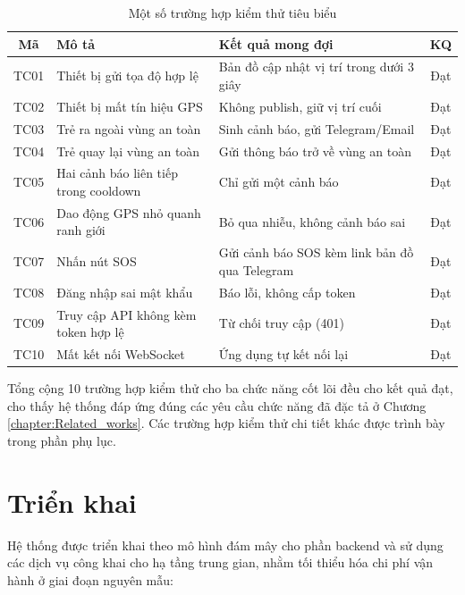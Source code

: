 \documentclass[../DoAn.tex]{subfiles}
\begin{document}
    \begin{table}[H]
    \centering
    \caption{Một số trường hợp kiểm thử tiêu biểu}
    \label{table:kiemthu}
    \begin{tabular}{|c|p{4.2cm}|p{4.2cm}|c|}
    \hline
    \textbf{Mã} & \textbf{Mô tả} & \textbf{Kết quả mong đợi} & \textbf{KQ} \\ \hline
    TC01 & Thiết bị gửi tọa độ hợp lệ & Bản đồ cập nhật vị trí trong dưới 3 giây & Đạt \\ \hline
    TC02 & Thiết bị mất tín hiệu GPS & Không publish, giữ vị trí cuối & Đạt \\ \hline
    TC03 & Trẻ ra ngoài vùng an toàn & Sinh cảnh báo, gửi Telegram/Email & Đạt \\ \hline
    TC04 & Trẻ quay lại vùng an toàn & Gửi thông báo trở về vùng an toàn & Đạt \\ \hline
    TC05 & Hai cảnh báo liên tiếp trong cooldown & Chỉ gửi một cảnh báo & Đạt \\ \hline
    TC06 & Dao động GPS nhỏ quanh ranh giới & Bỏ qua nhiễu, không cảnh báo sai & Đạt \\ \hline
    TC07 & Nhấn nút SOS & Gửi cảnh báo SOS kèm link bản đồ qua Telegram & Đạt \\ \hline
    TC08 & Đăng nhập sai mật khẩu & Báo lỗi, không cấp token & Đạt \\ \hline
    TC09 & Truy cập API không kèm token hợp lệ & Từ chối truy cập (401) & Đạt \\ \hline
    TC10 & Mất kết nối WebSocket & Ứng dụng tự kết nối lại & Đạt \\ \hline
    \end{tabular}
    \end{table}

    Tổng cộng 10 trường hợp kiểm thử cho ba chức năng cốt lõi đều cho kết quả đạt, cho thấy hệ thống đáp ứng đúng các yêu cầu chức năng đã đặc tả ở Chương \ref{chapter:Related_works}. Các trường hợp kiểm thử chi tiết khác được trình bày trong phần phụ lục.

    \section{Triển khai}

    Hệ thống được triển khai theo mô hình đám mây cho phần backend và sử dụng các dịch vụ công khai cho hạ tầng trung gian, nhằm tối thiểu hóa chi phí vận hành ở giai đoạn nguyên mẫu:
\end{document}
